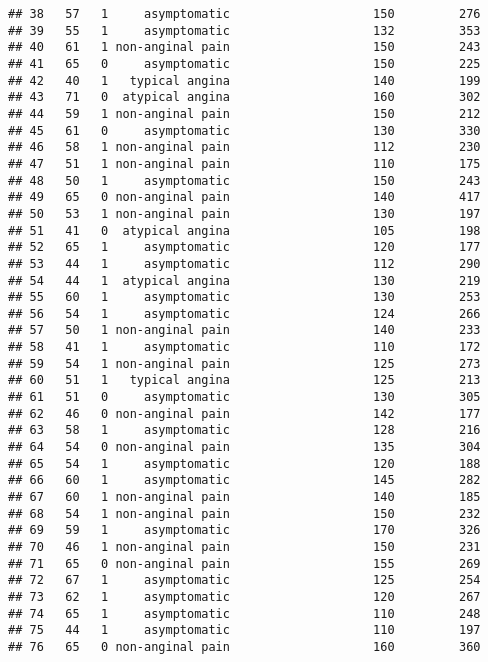 \documentclass[]{article}
\begin{document}
\begin{verbatim}
## 38   57   1     asymptomatic                    150         276
## 39   55   1     asymptomatic                    132         353
## 40   61   1 non-anginal pain                    150         243
## 41   65   0     asymptomatic                    150         225
## 42   40   1   typical angina                    140         199
## 43   71   0  atypical angina                    160         302
## 44   59   1 non-anginal pain                    150         212
## 45   61   0     asymptomatic                    130         330
## 46   58   1 non-anginal pain                    112         230
## 47   51   1 non-anginal pain                    110         175
## 48   50   1     asymptomatic                    150         243
## 49   65   0 non-anginal pain                    140         417
## 50   53   1 non-anginal pain                    130         197
## 51   41   0  atypical angina                    105         198
## 52   65   1     asymptomatic                    120         177
## 53   44   1     asymptomatic                    112         290
## 54   44   1  atypical angina                    130         219
## 55   60   1     asymptomatic                    130         253
## 56   54   1     asymptomatic                    124         266
## 57   50   1 non-anginal pain                    140         233
## 58   41   1     asymptomatic                    110         172
## 59   54   1 non-anginal pain                    125         273
## 60   51   1   typical angina                    125         213
## 61   51   0     asymptomatic                    130         305
## 62   46   0 non-anginal pain                    142         177
## 63   58   1     asymptomatic                    128         216
## 64   54   0 non-anginal pain                    135         304
## 65   54   1     asymptomatic                    120         188
## 66   60   1     asymptomatic                    145         282
## 67   60   1 non-anginal pain                    140         185
## 68   54   1 non-anginal pain                    150         232
## 69   59   1     asymptomatic                    170         326
## 70   46   1 non-anginal pain                    150         231
## 71   65   0 non-anginal pain                    155         269
## 72   67   1     asymptomatic                    125         254
## 73   62   1     asymptomatic                    120         267
## 74   65   1     asymptomatic                    110         248
## 75   44   1     asymptomatic                    110         197
## 76   65   0 non-anginal pain                    160         360

\end{verbatim}
\end{document}
